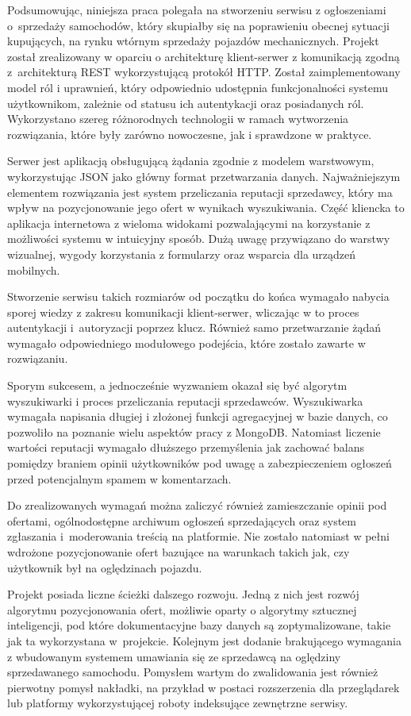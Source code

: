 Podsumowując, niniejsza praca polegała na stworzeniu serwisu z ogłoszeniami o~sprzedaży samochodów, który skupiałby się na poprawieniu obecnej sytuacji kupujących, na rynku wtórnym sprzedaży pojazdów mechanicznych.
Projekt został zrealizowany w oparciu o architekturę klient-serwer z komunikacją zgodną z~architekturą REST wykorzystującą protokół HTTP.
Został zaimplementowany model ról i uprawnień, który odpowiednio udostępnia funkcjonalności systemu użytkownikom, zależnie od statusu ich autentykacji oraz posiadanych ról.
Wykorzystano szereg różnorodnych technologii w ramach wytworzenia rozwiązania, które były zarówno nowoczesne, jak i sprawdzone w praktyce.

Serwer jest aplikacją obsługującą żądania zgodnie z modelem warstwowym, wykorzystując JSON jako główny format przetwarzania danych.
Najważniejszym elementem rozwiązania jest system przeliczania reputacji sprzedawcy, który ma wpływ na pozycjonowanie jego ofert w wynikach wyszukiwania.
Część kliencka to aplikacja internetowa z wieloma widokami pozwalającymi na korzystanie z możliwości systemu w intuicyjny sposób.
Dużą uwagę przywiązano do warstwy wizualnej, wygody korzystania z formularzy oraz wsparcia dla urządzeń mobilnych.

Stworzenie serwisu takich rozmiarów od początku do końca wymagało nabycia sporej wiedzy z zakresu komunikacji klient-serwer, wliczając w to proces autentykacji i~autoryzacji poprzez klucz.
Również samo przetwarzanie żądań wymagało odpowiedniego modułowego podejścia, które zostało zawarte w rozwiązaniu.

Sporym sukcesem, a jednocześnie wyzwaniem okazał się być algorytm wyszukiwarki i proces przeliczania reputacji sprzedawców.
Wyszukiwarka wymagała napisania długiej i złożonej funkcji agregacyjnej w bazie danych, co pozwoliło na poznanie wielu aspektów pracy z MongoDB.
Natomiast liczenie wartości reputacji wymagało dłuższego przemyślenia jak zachować balans pomiędzy braniem opinii użytkowników pod uwagę a zabezpieczeniem ogłoszeń przed potencjalnym spamem w komentarzach.

Do zrealizowanych wymagań można zaliczyć również zamieszczanie opinii pod ofertami, ogólnodostępne archiwum ogłoszeń sprzedających oraz system zgłaszania i~moderowania treścią na platformie.
Nie zostało natomiast w pełni wdrożone pozycjonowanie ofert bazujące na warunkach takich jak, czy użytkownik był na oględzinach pojazdu.

Projekt posiada liczne ścieżki dalszego rozwoju.
Jedną z nich jest rozwój algorytmu pozycjonowania ofert, możliwie oparty o algorytmy sztucznej inteligencji, pod które dokumentacyjne bazy danych są zoptymalizowane, takie jak ta wykorzystana w~projekcie.
Kolejnym jest dodanie brakującego wymagania z wbudowanym systemem umawiania się ze sprzedawcą na oględziny sprzedawanego samochodu.
Pomysłem wartym do zwalidowania jest również pierwotny pomysł nakładki, na przykład w postaci rozszerzenia dla przeglądarek lub platformy wykorzystującej roboty indeksujące zewnętrzne serwisy.

